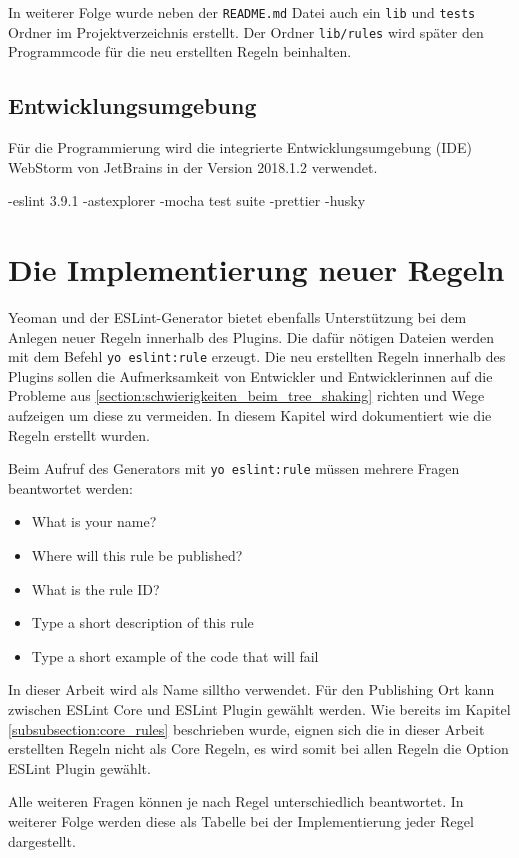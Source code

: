 In weiterer Folge wurde neben der \lstinline{README.md} Datei auch ein \lstinline{lib} und \lstinline{tests} Ordner im Projektverzeichnis erstellt. Der Ordner \lstinline{lib/rules} wird später den Programmcode für die neu erstellten Regeln beinhalten.

\subsection{Entwicklungsumgebung}
Für die Programmierung wird die integrierte Entwicklungsumgebung (IDE) WebStorm von JetBrains in der Version 2018.1.2 verwendet. 

-eslint 3.9.1
-astexplorer
-mocha test suite
-prettier
-husky


\section{Die Implementierung neuer Regeln}
Yeoman und der ESLint-Generator bietet ebenfalls Unterstützung bei dem Anlegen neuer Regeln innerhalb des Plugins. Die dafür nötigen Dateien werden mit dem Befehl \lstinline{yo eslint:rule} erzeugt. Die neu erstellten Regeln innerhalb des Plugins sollen die Aufmerksamkeit von Entwickler und Entwicklerinnen auf die Probleme aus \ref{section:schwierigkeiten_beim_tree_shaking} richten und Wege aufzeigen um diese zu vermeiden. In diesem Kapitel wird dokumentiert wie die Regeln erstellt wurden. 

Beim Aufruf des Generators mit \lstinline{yo eslint:rule} müssen mehrere Fragen beantwortet werden:

\begin{itemize}
	\item What is your name?
    \item Where will this rule be published?
    \item What is the rule ID?
    \item Type a short description of this rule
    \item Type a short example of the code that will fail
\end{itemize}

In dieser Arbeit wird als Name silltho verwendet. Für den Publishing Ort kann zwischen ESLint Core und ESLint Plugin gewählt werden. Wie bereits im Kapitel \ref{subsubsection:core_rules} beschrieben wurde, eignen sich die in dieser Arbeit erstellten Regeln nicht als Core Regeln, es wird somit bei allen Regeln die Option ESLint Plugin gewählt. 

Alle weiteren Fragen können je nach Regel unterschiedlich beantwortet. In weiterer Folge werden diese als Tabelle bei der Implementierung jeder Regel dargestellt.

